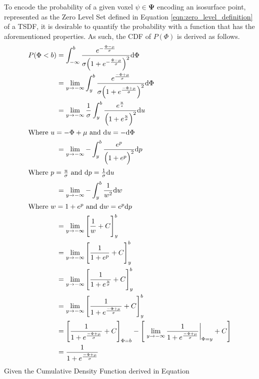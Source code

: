To encode the probability of a given voxel $\psi \in \mathbf{\Psi}$ encoding an
isosurface point, represented as the Zero Level Set defined in Equation
\ref{eqn:zero_level_definition} of a TSDF, it is desirable to quantify the
probability with a function that has the aforementioned properties. As such, the
CDF of $P(\Phi)$ is derived as follows.
\begin{align}
  \label{eqn:probobj_surface_prior_cdf}
  P(\Phi < b) &= \int_{-\infty}^{b} \frac
  {e^{-\frac{\Phi - \mu}{\sigma}}}
  {\sigma \Big( 1 + e^{-\frac{\Phi - \mu}{\sigma}} \Big)^{2}} {\mathrm d{\Phi}}\\
  &= \lim_{y\to -\infty} \int_{y}^{b} \frac
  {e^{\frac{-\Phi + \mu}{\sigma}}}
  {\sigma \Big( 1 + e^{\frac{-\Phi + \mu}{\sigma}} \Big)^{2}} {\mathrm d{\Phi}}\\
  &= \lim_{y\to -\infty} \frac{1}{\sigma} \int_{y}^{b}
  \frac{e^{\frac{u}{s}}}{\Big( 1 + e^{\frac{u}{\sigma}} \Big)^{2}} {\mathrm d{u}}\\
  \shortintertext{Where $u = -\Phi + \mu$ and ${\mathrm d{u}} = -{\mathrm d{\Phi}}$}
  &= \lim_{y\to -\infty} -\int_{y}^{b}
  \frac{e^{p}}{\Big( 1 + e^{p} \Big)^{2}} {\mathrm d{p}}\\
  \shortintertext{Where $p = \frac{u}{\sigma}$ and ${\mathrm d{p}} = \frac{1}{\sigma}
  {\mathrm d{u}}$}
  &= \lim_{y\to -\infty} -\int_{y}^{b} \frac{1}{w^{2}} {\mathrm d{w}}\\
  \shortintertext{Where $w = 1 + e^{p}$ and ${\mathrm d{w}} = e^{p} {\mathrm d{p}}$}
  &= \lim_{y\to -\infty} \Bigg[ \frac{1}{w} + C \Bigg]_{y}^{b}\\
  &= \lim_{y\to -\infty} \Bigg[ \frac{1}{1 + e^{p}} + C \Bigg]_{y}^{b}\\
  &= \lim_{y\to -\infty} \Bigg[ \frac{1}{1 +e^{\frac{u}{\sigma}}} + C
  \Bigg]_{y}^{b}\\
  &= \lim_{y\to -\infty} \Bigg[ \frac{1}{1 + e^{\frac{-\Phi + \mu}{\sigma}}} +
  C \Bigg]_{y}^{b}\\
  &= \Bigg[ \frac{1}{1 + e^{\frac{-\Phi + \mu}{\sigma}}} + C \Bigg]_{\Phi = b}
  - \Bigg[ \left. \lim_{y\to -\infty} \frac{1}{1 + e^{\frac{-\Phi + \mu}{\sigma}}}
  \right\rvert_{\Phi = y} + C \Bigg]\\
  &= \frac{1}{1 + e^{\frac{-\Phi + \mu}{\sigma}}}
\end{align}
Given the Cumulative Density Function derived in Equation
